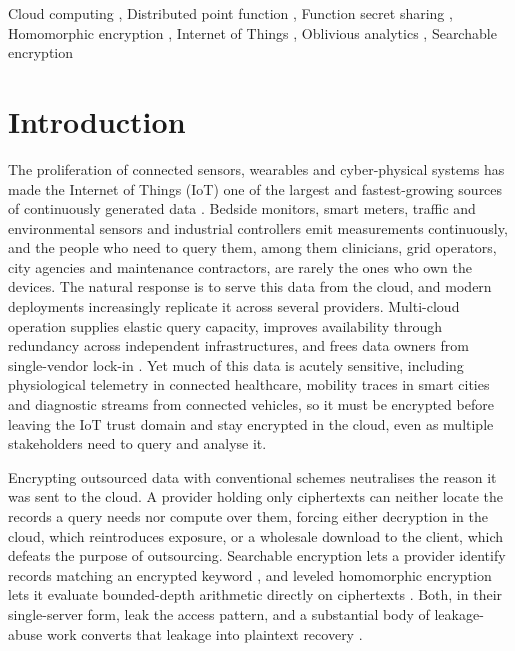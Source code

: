 \documentclass[a4paper,fleqn]{cas-sc}
\begin{document}
\begin{keywords}
Cloud computing \sep
Distributed point function \sep
Function secret sharing \sep
Homomorphic encryption \sep
Internet of Things \sep
Oblivious analytics \sep
Searchable encryption
\end{keywords}

\maketitle

\section{Introduction}
\label{sec:intro}

The proliferation of connected sensors, wearables and cyber-physical systems
has made the Internet of Things (IoT) one of the largest and fastest-growing
sources of continuously generated data \citep{atzori2010internet}. Bedside
monitors, smart meters, traffic and environmental sensors and industrial
controllers emit measurements continuously, and the people who need to query
them, among them clinicians, grid operators, city agencies and maintenance
contractors, are rarely the ones who own the devices. The natural response is
to serve this data from the cloud, and modern deployments increasingly
replicate it across several providers. Multi-cloud operation supplies elastic
query capacity, improves availability through redundancy across independent
infrastructures, and frees data owners from single-vendor lock-in
\citep{petcu2013multicloud,grozev2014intercloud}. Yet much of this data is
acutely sensitive, including physiological telemetry in connected healthcare,
mobility traces in smart cities and diagnostic streams from connected
vehicles, so it must be encrypted before leaving the IoT trust domain and stay
encrypted in the cloud, even as multiple stakeholders need to query and
analyse it.

Encrypting outsourced data with conventional schemes neutralises the reason it
was sent to the cloud. A provider holding only ciphertexts can neither locate
the records a query needs nor compute over them, forcing either decryption in
the cloud, which reintroduces exposure, or a wholesale download to the client,
which defeats the purpose of outsourcing. Searchable encryption lets a
provider identify records matching an encrypted keyword
\citep{song2000practical,curtmola2006searchable,islam2023keyword}, and leveled
homomorphic encryption lets it evaluate bounded-depth arithmetic directly on
ciphertexts \citep{fan2012somewhat,cryptoeprint:2016/421}. Both, in their
single-server form, leak the access pattern, and a substantial body of
leakage-abuse work converts that leakage into plaintext recovery
\citep{islam2012access,cash2015leakage,grubbs2017leakage}.
\end{document}
